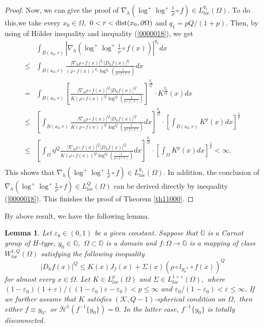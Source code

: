 \documentclass[11pt,twoside]{article}
\newtheorem{lem}[thm]{Lemma}
\theoremstyle{definition}
\theoremstyle{remark}
\newcommand{\abs}[1]{\left|#1\right|}
\begin{document}
\begin{proof}
Now, we can give the proof of  $\nabla_{h}(\log^{+}\log^{+}\frac{1}{\rho}\circ f)\in L_{loc}^{q_{1}}(\Omega).$ To do this,we take every $x_{0}\in\Omega,$ $0<r<{\rm dist}(x_{0},\partial\Omega)$ and $q_{1}=pQ/(1+p).$  Then, by using of H\"{o}lder inequality and
inequality (\ref{0000018}), we get
\begin{equation}\label{04}
\begin{aligned}
&\int_{B(x_{0},r)}\abs{\nabla_{h}(\log^{+}\log^{+}\frac{1}{\rho}\circ f(x))}^{q_{1}}dx\\
\leq&\int_{B(x_{0},r)}\frac{\vert\nabla_{h}\rho\circ f(x)\vert^{q_{1}}\vert D_{h}f(x)\vert^{q_{1}}}{(\rho\circ f(x))^{q_{1}}\log^{q_{1}}(\frac{1}{\rho\circ f(x)})}dx\\
=&\int_{B(x_{0},r)}\left[\frac{\vert\nabla_{h}\rho\circ f(x)\vert^{Q}\vert D_{h}f(x)\vert^{Q}}{K(\rho\circ f(x))^{Q}\log^{Q}(\frac{1}{\rho\circ f(x)})}\right]^{\frac{q_{1}}{Q}}\cdot K^{\frac{q_{1}}{Q}}(x)dx\\
\leq& \left[\int_{B(x_{0},r)}\frac{\vert\nabla_{h}\rho\circ f(x)\vert^{Q}\vert D_{h}f(x)\vert^{Q}}{K(\rho\circ f(x))^{Q}\log^{Q}(\frac{1}{\rho\circ f(x)})}dx\right]^{\frac{q_{1}}{Q}}\cdot \left[\int_{B(x_{0},r)}K^{p}(x)dx\right]^{\frac{1}{p}}\\
\leq& \left[\int_{\Omega}\eta^{Q}\frac{\vert\nabla_{h}\rho\circ f(x)\vert^{Q}\vert D_{h}f(x)\vert^{Q}}{K(\rho\circ f(x))^{Q}\log^{Q}(\frac{1}{\rho\circ f(x)})}dx\right]^{\frac{q_{1}}{Q}}\cdot \left[\int_{\Omega}K^{p}(x)dx\right]^{\frac{1}{p}}<\infty.\\
\end{aligned}
\end{equation}
This shows that $\nabla_{h}(\log^{+}\log^{+}\frac{1}{\rho}\circ f)\in L_{loc}^{q_{1}}(\Omega).$ In addition, the conclusion of $\nabla_{h}(\log^{+}\log^{+}\frac{1}{\rho}\circ f)\in L_{loc}^{Q}(\Omega)$ can be derived directly by inequality (\ref{0000018}). This finishes the proof of Theorem \ref{th11000}.
\end{proof}
By above result, we have the following lemma.
\begin{lem}\label{101209}
Let $\varepsilon_{0}\in(0,1)$ be a given constant. Suppose that $\mathbb{G}$ is a Carnot group of $H$-type,  $y_{0}\in\mathbb{G},$ $\Omega\subset\mathbb{G}$ is a domain and $f:\Omega\rightarrow \mathbb{G}$ is a mapping of class $W_{loc}^{1,Q}(\Omega)$ satisfying  the following inequality
$$\vert D_{h}f(x)\vert^{Q}\leq K(x)J_{f}(x)+\Sigma(x)(\rho\circ l_{y_{0}^{-1}}\circ f(x))^{Q}$$
for almost every $x\in\Omega.$ Let $K\in L_{loc}^{p}(\Omega)$ and $\Sigma\in L_{loc}^{1+\varepsilon}(\Omega),$ where $(1-\varepsilon_{0})(1+\varepsilon)/((1-\varepsilon_{0})\varepsilon-\varepsilon_{0})<p\leq\infty$ and $\varepsilon_{0}/(1-\varepsilon_{0})<\varepsilon\leq\infty.$  If we further assume that $K$  satisfies $(\mathcal{K},Q-1)$-spherical  condition on $\Omega,$ then either $f\equiv y_{0},$ or $\mathcal{H}^{1}(f^{-1}\{y_{0}\})=0.$  In the latter case, $f^{-1}\{y_{0}\}$ is totally disconnected.
\end{lem}
\end{document}
